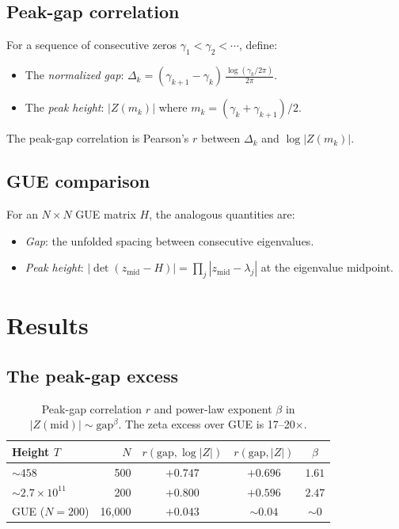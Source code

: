 \documentclass[11pt,a4paper]{article}
\begin{document}
\subsection{Peak-gap correlation}

For a sequence of consecutive zeros $\gamma_1 < \gamma_2 < \cdots$, define:
\begin{itemize}[nosep]
\item The \emph{normalized gap}: $\Delta_k = (\gamma_{k+1} - \gamma_k)\, \frac{\log(\gamma_k/2\pi)}{2\pi}$.
\item The \emph{peak height}: $|Z(m_k)|$ where $m_k = (\gamma_k + \gamma_{k+1})/2$.
\end{itemize}
The peak-gap correlation is Pearson's $r$ between $\Delta_k$ and $\log|Z(m_k)|$.

\subsection{GUE comparison}

For an $N \times N$ GUE matrix $H$, the analogous quantities are:
\begin{itemize}[nosep]
\item \emph{Gap}: the unfolded spacing between consecutive eigenvalues.
\item \emph{Peak height}: $|\det(z_{\mathrm{mid}} - H)| = \prod_j |z_{\mathrm{mid}} - \lambda_j|$ at the eigenvalue midpoint.
\end{itemize}

\section{Results}

\subsection{The peak-gap excess}

\begin{table}[ht]
\centering
\begin{tabular}{@{}lrccc@{}}
\toprule
Height $T$ & $N$ & $r(\mathrm{gap},\log|Z|)$ & $r(\mathrm{gap},|Z|)$ & $\beta$ \\
\midrule
$\sim 458$         & 500    & $\mathbf{+0.747}$ & $+0.696$ & $1.61$ \\
$\sim 2.7\times10^{11}$ & 200 & $\mathbf{+0.800}$ & $+0.596$ & $2.47$ \\
GUE ($N\!=\!200$)    & 16{,}000 & $+0.043$        & ${\sim}0.04$ & ${\sim}0$ \\
\bottomrule
\end{tabular}
\caption{Peak-gap correlation $r$ and power-law exponent $\beta$ in $|Z(\mathrm{mid})| \sim \mathrm{gap}^\beta$. The zeta excess over GUE is 17--20$\times$.}
\label{tab:peakgap}
\end{table}
\end{document}
